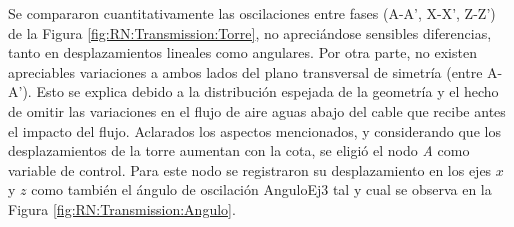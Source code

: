 \begingroup
\begin{figure}[htbp]
	\centering
	\label{fig:RN:Transmission:ForceVelTormenta}
\end{figure}
\endgroup


Se compararon cuantitativamente las oscilaciones entre fases (A-A', X-X', Z-Z') de la Figura \ref{fig:RN:Transmission:Torre}, no apreciándose sensibles diferencias, tanto en desplazamientos lineales como angulares. Por otra parte, no existen apreciables variaciones a ambos lados del plano transversal de simetría (entre A-A'). Esto se explica debido a la distribución espejada de la geometría y el hecho de omitir las variaciones en el flujo de aire aguas abajo del cable que recibe antes el impacto del flujo. Aclarados los aspectos mencionados, y considerando que los desplazamientos de la torre aumentan con la cota, se eligió el nodo \textit{A} como variable de control. Para este nodo se registraron su desplazamiento en los ejes $x$ y $z$ como también el ángulo de oscilación \gls{AnguloEj3} tal y cual se observa en la Figura \ref{fig:RN:Transmission:Angulo}.

